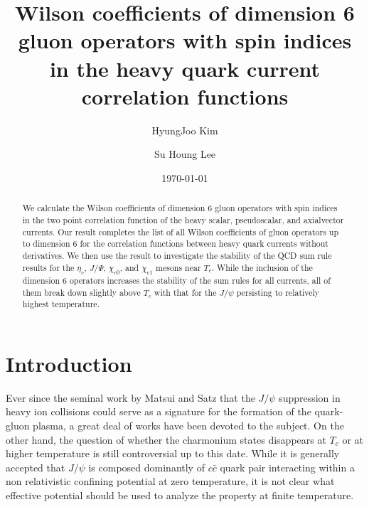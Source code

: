 \documentclass[aps,prc,superscriptaddress,showpacs,floatfix, nofootinbib,preprintnumbers,twocolumn]{revtex4}
\begin{document}
\title{Wilson coefficients of dimension 6 gluon operators with spin indices in the heavy quark current correlation functions}

\author{HyungJoo Kim}
\author{Su Houng Lee}
\date{\today}
\begin{abstract}
 We calculate the Wilson coefficients of dimension 6 gluon operators with spin indices in the two point correlation function of the heavy scalar, pseudoscalar, and axialvector currents. Our result completes the list of all Wilson coefficients of gluon operators up to dimension 6 for the correlation functions between heavy quark currents without derivatives. 
We then use the result to investigate the stability of the QCD sum rule results  for the  $\eta_c$, $J/\Psi$, $\chi_{c0}$, and $\chi_{c1}$ mesons near $T_c$.
While the inclusion of the dimension 6 operators increases the stability of the sum rules for all currents, all of them break down slightly above $T_c$  with that for the $J/\psi$ persisting to relatively highest temperature.  
\end{abstract}


\maketitle

\section{Introduction}
Ever since the seminal work by Matsui and Satz\cite{Matsui:1986dk} that the $J/\psi$ suppression in heavy ion collisions could serve as a signature for the formation of the quark-gluon plasma, a great deal of works have been devoted to the subject\cite{Andronic:2015wma}.  
On the other hand, the question of whether the charmonium states  disappears at $T_c$ or at higher temperature is still controversial up to this date\cite{Kim:2015rdi}.  
While it is generally accepted that  $J/\psi$ is composed dominantly of $c \bar{c}$ quark pair interacting within a non relativistic confining potential at zero temperature, it is not clear what effective potential should be used to analyze the  property at finite temperature\cite{Lee:2013dca,Satz:2015jsa}.
\end{document}
